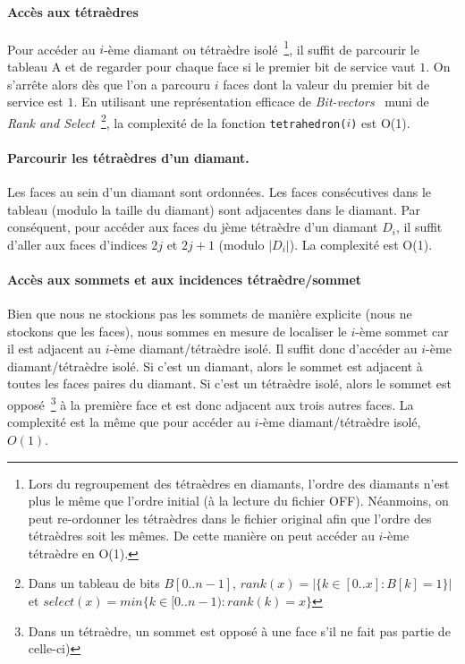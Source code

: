 \paragraph{Accès aux tétraèdres}
\noindent
Pour accéder au $i$-ème diamant ou tétraèdre isolé~\footnote{Lors du regroupement des tétraèdres en diamants, l'ordre des diamants n'est plus le même que l'ordre initial (à la lecture du fichier OFF). Néanmoins, on peut re-ordonner les tétraèdres dans le fichier original afin que l'ordre des tétraèdres soit les mêmes. De cette manière on peut accéder au $i$-ème tétraèdre en O(1).}, il suffit de parcourir le tableau A et de regarder pour chaque face si le premier bit de service vaut $1$. On s'arrête alors dès que l'on a parcouru $i$ faces dont la valeur du premier bit de service est $1$. En utilisant une représentation efficace de \emph{Bit-vectors}~\cite{rank_and_select} muni de \emph{Rank and Select}~\footnote{
Dans un tableau de bits $B[0..n-1]$, $rank(x) = |\{k\in [0..x] : B[k]=1\}|$ et $select(x)=min\{k\in [0..n-1) : rank(k)=x\}$
}, la complexité de la fonction \texttt{tetrahedron($i$)} est O(1).

\paragraph{Parcourir les tétraèdres d'un diamant.}
\noindent
Les faces au sein d'un diamant sont ordonnées. Les faces consécutives dans le tableau (modulo la taille du diamant) sont adjacentes dans le diamant. 
Par conséquent, pour accéder aux faces du jème tétraèdre d'un diamant $D_i$, il suffit d'aller aux faces d'indices $2j$ et $2j+1$ (modulo $|D_i|$). 
La complexité est O(1).


\paragraph{Accès aux sommets et aux incidences tétraèdre/sommet}
\noindent
Bien que nous ne stockions pas les sommets de manière explicite (nous ne stockons que les faces), nous sommes en mesure de localiser le $i$-ème sommet car il est adjacent au $i$-ème diamant/tétraèdre isolé. Il suffit donc d'accéder au $i$-ème diamant/tétraèdre isolé. Si c'est un diamant, alors le sommet est adjacent à toutes les faces paires du diamant. Si c'est un tétraèdre isolé, alors le sommet est opposé~\footnote{Dans un tétraèdre, un sommet est opposé à une face s'il ne fait pas partie de celle-ci)} à la première face et est donc adjacent aux trois autres faces. 
La complexité est la même que pour accéder au $i$-ème diamant/tétraèdre isolé, $O(1)$.

